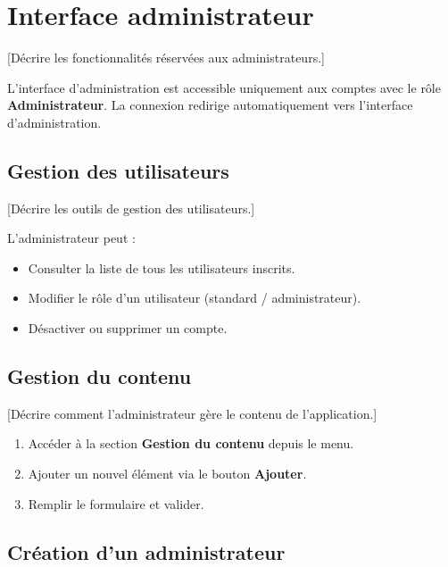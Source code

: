 \documentclass[12pt, a4paper]{article}
\begin{document}
\section{Interface administrateur}

[Décrire les fonctionnalités réservées aux administrateurs.]

\begin{remarque}
  L'interface d'administration est accessible uniquement aux comptes avec le
  rôle \textbf{Administrateur}. La connexion redirige automatiquement vers
  l'interface d'administration.
\end{remarque}

\subsection{Gestion des utilisateurs}

[Décrire les outils de gestion des utilisateurs.]

L'administrateur peut :
\begin{itemize}
  \item Consulter la liste de tous les utilisateurs inscrits.
  \item Modifier le rôle d'un utilisateur (standard / administrateur).
  \item Désactiver ou supprimer un compte.
\end{itemize}

\subsection{Gestion du contenu}

[Décrire comment l'administrateur gère le contenu de l'application.]

\begin{enumerate}
  \item Accéder à la section \textbf{Gestion du contenu} depuis le menu.
  \item Ajouter un nouvel élément via le bouton \textbf{Ajouter}.
  \item Remplir le formulaire et valider.
\end{enumerate}

\subsection{Création d'un administrateur}
\end{document}
